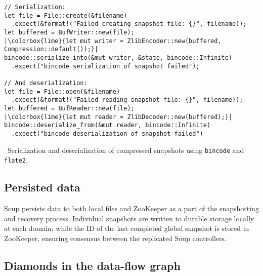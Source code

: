 \begin{listing}[H]
  \begin{verbatim}
// Serialization:
let file = File::create(&filename)
  .expect(&format!("Failed creating snapshot file: {}", filename));
let buffered = BufWriter::new(file);
|\colorbox{lime}{let mut writer = ZlibEncoder::new(buffered, Compression::default());}|
bincode::serialize_into(&mut writer, &state, bincode::Infinite)
  .expect("bincode serialization of snapshot failed");

// And deserialization:
let file = File::open(&filename)
  .expect(&format!("Failed reading snapshot file: {}", filename));
let buffered = BufReader::new(file);
|\colorbox{lime}{let mut reader = ZlibDecoder::new(buffered);}|
bincode::deserialize_from(&mut reader, bincode::Infinite)
  .expect("bincode deserialization of snapshot failed")
  \end{verbatim}
  \caption{\
    Serialization and deserialization of compressed snapshots using
    \texttt{bincode} and \texttt{flate2}.
  }
\end{listing}

\subsection{Persisted data}

Soup persists data to both local files and ZooKeeper as a part of the
snapshotting and recovery process. Individual snapshots are written to durable
storage locally at each domain, while the ID of the last completed global
snapshot is stored in ZooKeeper, ensuring consensus between the replicated Soup
controllers.

\subsection{Diamonds in the data-flow graph}
\todo{}
